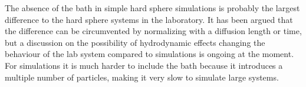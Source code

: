 The absence of the bath in simple hard sphere simulations is probably the largest difference to the hard sphere systems in the laboratory. It has been argued that the difference can be circumvented by normalizing with a diffusion length or time, but a discussion on the possibility of hydrodynamic effects changing the behaviour of the lab system compared to simulations is ongoing at the moment.\\ 

For simulations it is much harder to include the bath because it introduces a multiple number of particles, making it very slow to simulate large systems.\\





